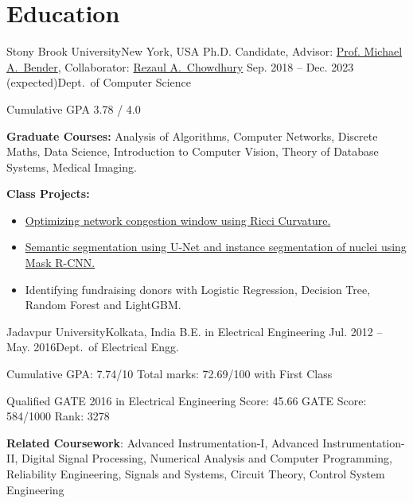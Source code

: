 \documentclass[letterpaper,10pt]{article}
\begin{document}
\section*{Education}
\resumeSubHeadingListStart
\resumeSubheading
{Stony Brook University}{New York, USA}
{Ph.D. Candidate, Advisor: \href{https://www3.cs.stonybrook.edu/~bender/}{Prof. Michael A.\ Bender}, Collaborator: \href{https://www3.cs.stonybrook.edu/~rezaul/}{Rezaul A.\ Chowdhury}}
{Sep. 2018 -- Dec. 2023 (expected)}{Dept.\ of Computer Science}
\resumeItemListStart
\item Cumulative GPA 3.78 / 4.0
\item \textbf{Graduate Courses:} Analysis of Algorithms, Computer Networks, Discrete Maths, Data Science, Introduction to Computer Vision, Theory of Database Systems, Medical Imaging.
\item \textbf{Class Projects:} 
\begin{itemize}
    \item \href{https://github.com/ArghyaB118/network_curvature/blob/master/Text/project_534.pdf}{Optimizing network congestion window using Ricci Curvature.}
    \item \href{https://github.com/ArghyaB118/Image_Segmentation/blob/main/Project_CSE527/Final_Report.pdf}{Semantic segmentation using U-Net and instance segmentation of nuclei using Mask R-CNN.}
    \item {Identifying fundraising donors with Logistic Regression, Decision Tree, Random Forest and LightGBM.}
\end{itemize}
\resumeItemListEnd

\resumeSubheading
{Jadavpur University}{Kolkata, India}
{B.E. in Electrical Engineering }{Jul. 2012 -- May. 2016}{Dept.\ of Electrical Engg.}
\resumeItemListStart
\item {Cumulative GPA: 7.74/10 Total marks: 72.69/100 with First Class}
\item {Qualified GATE 2016 in Electrical Engineering Score: 45.66 GATE Score: 584/1000 Rank: 3278}
\item {\textbf{Related Coursework}: Advanced Instrumentation-I, Advanced Instrumentation-II, Digital Signal Processing, Numerical Analysis and Computer Programming, Reliability Engineering, Signals and Systems, Circuit Theory, Control System Engineering}
\resumeItemListEnd

\resumeSubHeadingListEnd 
\end{document}
